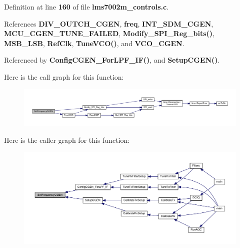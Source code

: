 Definition at line {\bf 160} of file {\bf lms7002m\+\_\+controls.\+c}.



References {\bf D\+I\+V\+\_\+\+O\+U\+T\+C\+H\+\_\+\+C\+G\+EN}, {\bf freq}, {\bf I\+N\+T\+\_\+\+S\+D\+M\+\_\+\+C\+G\+EN}, {\bf M\+C\+U\+\_\+\+C\+G\+E\+N\+\_\+\+T\+U\+N\+E\+\_\+\+F\+A\+I\+L\+ED}, {\bf Modify\+\_\+\+S\+P\+I\+\_\+\+Reg\+\_\+bits()}, {\bf M\+S\+B\+\_\+\+L\+SB}, {\bf Ref\+Clk}, {\bf Tune\+V\+C\+O()}, and {\bf V\+C\+O\+\_\+\+C\+G\+EN}.



Referenced by {\bf Config\+C\+G\+E\+N\+\_\+\+For\+L\+P\+F\+\_\+\+I\+F()}, and {\bf Setup\+C\+G\+E\+N()}.



Here is the call graph for this function\+:
\nopagebreak
\begin{figure}[H]
\begin{center}
\leavevmode
\includegraphics[width=350pt]{d3/d86/lms7002m__controls_8h_a13455749a0a6962ed7e40af28ee4b751_cgraph}
\end{center}
\end{figure}




Here is the caller graph for this function\+:
\nopagebreak
\begin{figure}[H]
\begin{center}
\leavevmode
\includegraphics[width=350pt]{d3/d86/lms7002m__controls_8h_a13455749a0a6962ed7e40af28ee4b751_icgraph}
\end{center}
\end{figure}


